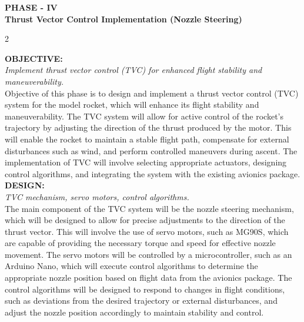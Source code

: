 \documentclass[10pt]{report}
\begin{document}
  \newpage 
  \begin{center}
    \textbf{\LARGE PHASE - IV} \\
    \vspace{0.2cm}
    \textbf{\Large Thrust Vector Control Implementation (Nozzle Steering)}
  \end{center}
  \begin{multicols}{2}

  \noindent \textbf{\large OBJECTIVE:} \\ \textit{Implement thrust vector control (TVC) for enhanced flight stability and maneuverability.} \\
  Objective of this phase is to design and implement a thrust vector control (TVC) system for the model rocket, which will enhance its flight stability and maneuverability. The TVC system will allow for active control of the rocket's trajectory by adjusting the direction of the thrust produced by the motor. This will enable the rocket to maintain a stable flight path, compensate for external disturbances such as wind, and perform controlled maneuvers during ascent. The implementation of TVC will involve selecting appropriate actuators, designing control algorithms, and integrating the system with the existing avionics package. \\

  \noindent \textbf{\large DESIGN:}\\  \textit{TVC mechanism, servo motors, control algorithms.}\\
  The main component of the TVC system will be the nozzle steering mechanism, which will be designed to allow for precise adjustments to the direction of the thrust vector. This will involve the use of servo motors, such as MG90S, which are capable of providing the necessary torque and speed for effective nozzle movement. The servo motors will be controlled by a microcontroller, such as an Arduino Nano, which will execute control algorithms to determine the appropriate nozzle position based on flight data from the avionics package. The control algorithms will be designed to respond to changes in flight conditions, such as deviations from the desired trajectory or external disturbances, and adjust the nozzle position accordingly to maintain stability and control. \\


\end{multicols}
\end{document}
